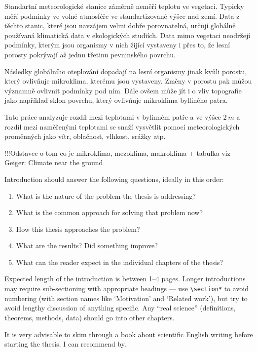 Standartní meteorologické stanice záměrně neměří teplotu ve vegetaci. Typicky měří podmínky ve volné atmosféře ve standartizované výšce nad zemí. Data z těchto stanic, které jsou navzájem velmi dobře porovnatelná, určují globálně používaná klimatická data v ekologických studiích. Data mimo vegetaci neodržejí podmínky, kterým jsou organismy v nich žijící vystaveny i přes to, že lesní porosty pokrývají až jednu třetinu pevninského povrchu.

Následky globálního oteplování dopadají na lesní organismy jinak kvůli porostu, který ovlivňuje mikroklima, kterému jsou vystaveny. Změny v porostu pak můžou významně ovlivnit podmínky pod ním. Dále ovšem může jít i o vliv topografie jako například sklon povrchu, který ovlivňuje mikroklima bylliného patra. 

Tato práce analyzuje rozdíl mezi teplotami v bylinném patře a ve výšce $\SI{2}{m}$ a rozdíl mezi naměřenými teplotami se snaží vysvětlit pomocí meteorologických proměnných jako vítr, oblačnost, vlhkost, srážky atp. 


!!!Odstavec o tom co je mikroklima, mezoklima, makroklima + tabulka viz Geiger: Climate near the ground



Introduction should answer the following questions, ideally in this order:
\begin{enumerate}
\item What is the nature of the problem the thesis is addressing?
\item What is the common approach for solving that problem now?
\item How this thesis approaches the problem?
\item What are the results? Did something improve?
\item What can the reader expect in the individual chapters of the thesis?
\end{enumerate}

Expected length of the introduction is between 1--4 pages. Longer introductions may require sub-sectioning with appropriate headings --- use \texttt{\textbackslash{}section*} to avoid numbering (with section names like `Motivation' and `Related work'), but try to avoid lengthy discussion of anything specific. Any ``real science'' (definitions, theorems, methods, data) should go into other chapters.

It is very advisable to skim through a book about scientific English writing before starting the thesis. I can recommend by.

